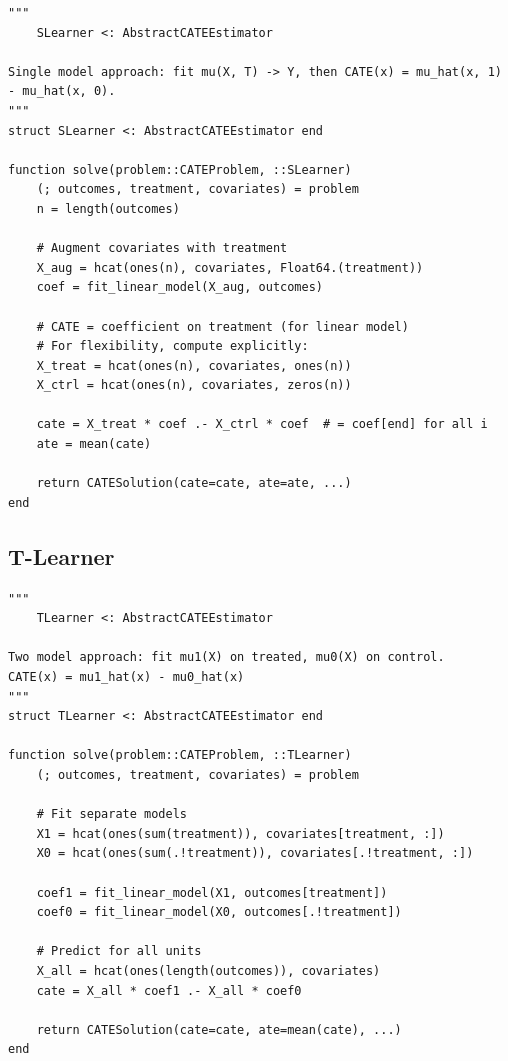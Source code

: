 \begin{verbatim}
"""
    SLearner <: AbstractCATEEstimator

Single model approach: fit mu(X, T) -> Y, then CATE(x) = mu_hat(x, 1) - mu_hat(x, 0).
"""
struct SLearner <: AbstractCATEEstimator end

function solve(problem::CATEProblem, ::SLearner)
    (; outcomes, treatment, covariates) = problem
    n = length(outcomes)

    # Augment covariates with treatment
    X_aug = hcat(ones(n), covariates, Float64.(treatment))
    coef = fit_linear_model(X_aug, outcomes)

    # CATE = coefficient on treatment (for linear model)
    # For flexibility, compute explicitly:
    X_treat = hcat(ones(n), covariates, ones(n))
    X_ctrl = hcat(ones(n), covariates, zeros(n))

    cate = X_treat * coef .- X_ctrl * coef  # = coef[end] for all i
    ate = mean(cate)

    return CATESolution(cate=cate, ate=ate, ...)
end
\end{verbatim}

\subsection{T-Learner}

\begin{verbatim}
"""
    TLearner <: AbstractCATEEstimator

Two model approach: fit mu1(X) on treated, mu0(X) on control.
CATE(x) = mu1_hat(x) - mu0_hat(x)
"""
struct TLearner <: AbstractCATEEstimator end

function solve(problem::CATEProblem, ::TLearner)
    (; outcomes, treatment, covariates) = problem

    # Fit separate models
    X1 = hcat(ones(sum(treatment)), covariates[treatment, :])
    X0 = hcat(ones(sum(.!treatment)), covariates[.!treatment, :])

    coef1 = fit_linear_model(X1, outcomes[treatment])
    coef0 = fit_linear_model(X0, outcomes[.!treatment])

    # Predict for all units
    X_all = hcat(ones(length(outcomes)), covariates)
    cate = X_all * coef1 .- X_all * coef0

    return CATESolution(cate=cate, ate=mean(cate), ...)
end
\end{verbatim}

